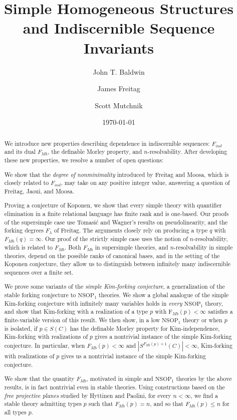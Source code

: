 \documentclass[11pt]{amsart}
\title{Simple Homogeneous Structures and Indiscernible Sequence Invariants}
\author[1]{John T. Baldwin}
\author[2]{James Freitag}
\author[3]{Scott Mutchnik}
\date{\today}
\theoremstyle{definition}
\theoremstyle{remark}
\numberwithin{equation}{section}
\begin{document}
\begin{abstract}
We introduce new properties describing dependence in indiscernible sequences: $F_{ind}$ and its dual $F_{Mb}$, the definable Morley property, and $n$-resolvability. After developing these new properties, we resolve a number of open questions:

We show that the \textit{degree of nonminimality} introduced by Freitag and Moosa, which is closely related  to $F_{ind}$, may take on any positive integer value, answering a question of Freitag, Jaoui, and Moosa.

Proving a conjecture of Koponen, we show that every simple theory with quantifier elimination in a finite relational language has finite rank and is one-based. Our proofs of the supersimple case use Tomasi\'c and Wagner's results on pseudolinearity, and the forking degrees $F_{\lambda}$ of Freitag. The arguments closely rely on producing a type $q$ with $F_{Mb}(q) = \infty$. Our proof of the strictly simple case uses the notion of $n$-resolvability, which is related to $F_{Mb}$. Both $F_{Mb}$ in supersimple theories, and $n$-resolvability in simple theories, depend on the possible ranks of canonical bases, and in the setting of the Koponen conjecture, they allow us to distinguish between infinitely many indiscernible sequences over a finite set. 

We prove some variants of the \textit{simple Kim-forking conjecture}, a generalization of the stable forking conjecture to $\mathrm{NSOP}_{1}$ theories. We show a global analogue of the simple Kim-forking conjecture with infinitely many variables holds in \textit{every} $\mathrm{NSOP}_{1}$ theory, and show that Kim-forking with a realization of a type $p$ with $\mathrm{F}_{Mb}(p) < \infty$ satisfies a finite-variable version of this result. We then show, in a low $\mathrm{NSOP}_{1}$ theory or when $p$ is isolated, if $p \in S(C)$ has the definable Morley property for Kim-independence, Kim-forking with realizations of $p$ gives a nontrivial instance of the simple Kim-forking conjecture. In particular, when $F_{Mb}(p) < \infty$ and $|S^{F_{Mb}(p) + 1}(C)| < \infty$, Kim-forking with realizations of $p$ gives us a nontrivial instance of the simple Kim-forking conjecture.

We show that the quantity $F_{Mb}$, motivated in simple and $\mathrm{NSOP}_{1}$ theories by the above results, is in fact nontrivial even in stable theories. Using constructions based on the \textit{free projective planes} studied by Hyttinen and Paolini, for every $n < \infty$, we find a stable theory admitting types $p$ such that $F_{Mb}(p) = n$, and so that $F_{Mb}(p) \leq n$ for all types $p$.
\end{abstract}
\end{document}
